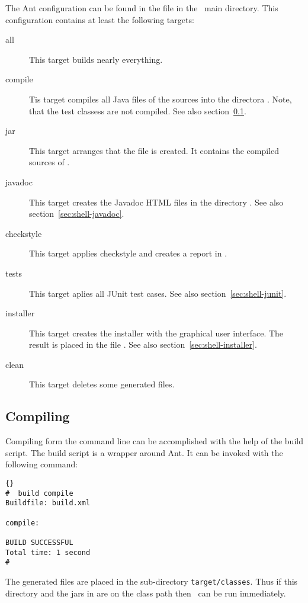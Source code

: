 The Ant configuration can be found in the file  in the
\ExTeX\ main directory. This configuration contains at least the
following targets:

\begin{description}
\item [all] This target builds nearly everything.
\item [compile] Tis target compiles all Java files of the sources into
  the directora . Note, that the test classess
  are not compiled. See also section~\ref{sec:shell-compile}.
\item [jar] This target arranges that the file 
  is created. It contains the compiled sources of  \ExTeX.
\item [javadoc] This target creates the Javadoc HTML files in the
  directory . See also section~\ref{sec:shell-javadoc}.
\item [checkstyle] This target applies checkstyle and creates a report
  in .
\item [tests] This target aplies all JUnit test cases. See also
  section~\ref{sec:shell-junit}.
\item [installer] This target creates the installer with the graphical
  user interface. The result is placed in the file
  . See also section~\ref{sec:shell-installer}.
\item [clean] This target deletes some generated files.
\end{description}


\subsection{Compiling \ExTeX}\label{sec:shell-compile}

Compiling \ExTeX form the command line can be accomplished with the
help of the build script. The build script is a wrapper around Ant. It
can be invoked with the following command:

\begin{lstlisting}{}
#  build compile
Buildfile: build.xml

compile:

BUILD SUCCESSFUL
Total time: 1 second
#
\end{lstlisting}

The generated files are placed in the sub-directory
\texttt{target/classes}. Thus if this directory and the jars in
 are on the class path then \ExTeX\ can be run immediately.


